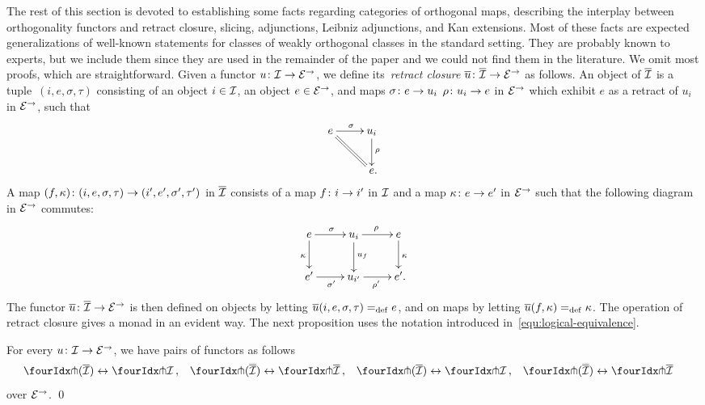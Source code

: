 \documentclass[reqno,10pt,a4paper,oneside,draft]{amsart}
\begin{document}
{{The rest of this section is devoted to establishing some facts regarding categories of orthogonal maps, describing the interplay between orthogonality functors and retract closure, slicing, adjunctions, Leibniz adjunctions, and Kan extensions.
Most of these facts are expected generalizations of well-known statements for classes of weakly orthogonal classes in the standard setting.
They are probably known to experts, but we include them since they are used in the remainder of the paper and we could not find them in the literature.
We omit most proofs, which are straightforward.
Given a functor $u \co \cal{I} \to \calE^\to$, we define its~\emph{retract closure} $\overline{u} \co \overline{\cal{I}} \to \catE^\to$ as follows.
An object of $\overline{\cal{I}}$ is a tuple~$(i, e, \sigma, \tau)$ consisting of an object $i \in \cal{I}$, an object $e \in \catE^\to$, and maps $\sigma \co e \rightarrow u_i$ $\rho \co u_i \rightarrow e$ in $\catE^\to$ which exhibit $e$ as a retract of $u_i$ in $\catE^\to$, \ie such that
\[
\xymatrix{
  e
  \ar[r]^{\sigma}
  \ar@{=}[dr]
&
  u_i
  \ar[d]^{\rho}
\\&
  e
\rlap{.}}
\]
A map $(f, \kappa) \co (i, e, \sigma, \tau) \to (i', e', \sigma', \tau')$ in $\overline{\cal{I}}$ consists of a map $f \co i \to i'$ in $\cal{I}$ and a map $\kappa \co e \rightarrow e'$ in $\catE^\to$ such that the following diagram in $\catE^\to$ commutes:
\[
\xymatrix{
  e
  \ar[r]^{\sigma}
  \ar[d]_{\kappa}
&
  u_i
  \ar[r]^{\rho}
  \ar[d]^{u_f}
&
  e
  \ar[d]^{\kappa}
\\
  e'
  \ar[r]_{\sigma'}
&
  u_{i'}
  \ar[r]_{\rho'}
&
  e'
\rlap{.}}
\]
The functor $\overline{u} \co \overline{\cal{I}} \to \catE^\to$ is then defined on objects by letting $\overline{u}(i, e, \sigma, \tau) \defeq e$, and on maps by letting $\overline{u}(f, \kappa) \defeq \kappa$.
The operation of retract closure gives a monad in an evident way.
The next proposition uses the notation introduced in~\eqref{equ:logical-equivalence}.

\begin{proposition} \label{retract-closure}
For every $u \co \cal{I} \to \catE^\to$, we have pairs of functors as follows
\[
\begin{aligned}
  \liftr{(\overline{\cal{I}})} &\leftrightarrow \liftr{\cal{I}}
\, ,&
  \liftr{(\overline{\overline{\cal{I}}})} &\leftrightarrow \liftr{\overline{\cal{I}}}
\, ,&
  \liftl{(\overline{\cal{I}})} &\leftrightarrow \liftl{\cal{I}}
\, ,&
 \liftl{(\overline{\overline{\cal{I}}})} &\leftrightarrow \liftl{\overline{\cal{I}}}
\end{aligned}
\]
over $\catE^\to$.
\qed
\end{proposition}

}}
\end{document}
